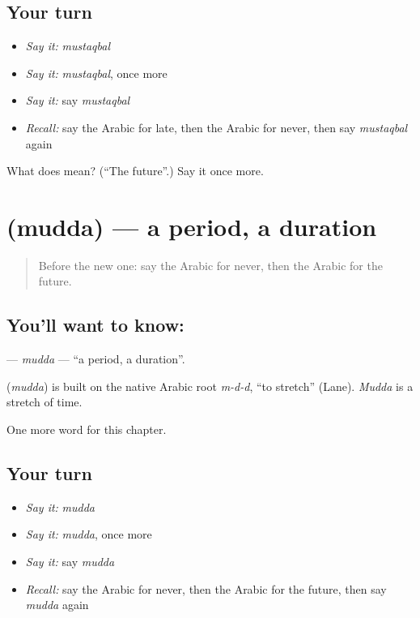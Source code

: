 \subsection*{Your turn}
\begin{itemize}
\raggedright
  \item \emph{Say it:} \emph{mustaqbal}
  \item \emph{Say it:} \emph{mustaqbal}, once more
  \item \emph{Say it:} say \emph{mustaqbal}
  \item \emph{Recall:} say the Arabic for late, then the Arabic for never, then say \emph{mustaqbal} again
\end{itemize}

\begin{tcolorbox}[breakable,colback=teal!4,colframe=teal!35!black,title={Before you move on}]
What does  mean? (\textquotedblleft{}The future\textquotedblright{}.) Say it once more.
\end{tcolorbox}
\section[\texorpdfstring{\ar{مدة} (mudda)}{مدة (mudda)}]{ (mudda) — a period, a duration}

\label{lesson:AR-C171-mudda}



\begin{quote}
Before the new one: say the Arabic for never, then the Arabic for the future.
\end{quote}

\subsection*{You'll want to know: }
\textbf{} — \emph{mudda} — \textquotedblleft{}a period, a duration\textquotedblright{}.

\begin{cousinweb}
\textbf{} (\emph{mudda}) is built on the native Arabic root \emph{m-d-d}, \textquotedblleft{}to stretch\textquotedblright{} (Lane). \emph{Mudda} is a stretch of time.
\end{cousinweb}

\begin{grammarlens}[title={What you've built}]
One more word for this chapter.
\end{grammarlens}

\subsection*{Your turn}
\begin{itemize}
\raggedright
  \item \emph{Say it:} \emph{mudda}
  \item \emph{Say it:} \emph{mudda}, once more
  \item \emph{Say it:} say \emph{mudda}
  \item \emph{Recall:} say the Arabic for never, then the Arabic for the future, then say \emph{mudda} again
\end{itemize}

